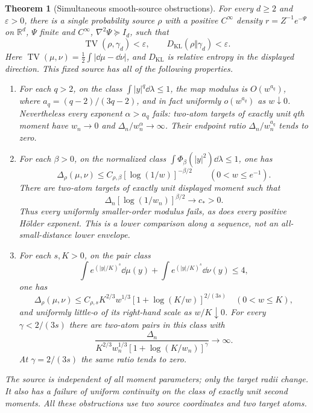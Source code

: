 \documentclass[11pt]{article}
\numberwithin{equation}{section}
\newtheorem{theorem}{Theorem}[section]
\theoremstyle{remark}\newtheorem{remark}[theorem]{Remark}
\newcommand{\R}{\mathbb R}\newcommand{\E}{\mathbb E}
\begin{document}
\begin{theorem}[Simultaneous smooth-source obstructions]\label{thm:bad-source}
For every $d\ge2$ and $\varepsilon>0$, there is a single probability source $\rho$ with a positive $C^\infty$ density $r=Z^{-1}e^{-\Psi}$ on $\R^d$, $\Psi$ finite and $C^\infty$, $\nabla^2\Psi\succeq I_d$, such that
\begin{equation}\label{eq:near-gaussian}
 \operatorname{TV}(\rho,\gamma_d)<\varepsilon,
 \qquad D_{\mathrm{KL}}(\rho\Vert\gamma_d)<\varepsilon.
\end{equation}
Here $\operatorname{TV}(\mu,\nu)=\tfrac12\int|\dd\mu-\dd\nu|$, and $D_{\mathrm{KL}}$ is relative entropy in the displayed direction. This fixed source has all of the following properties.
\begin{enumerate}
\item For each $q>2$, on the class $\int|y|^q\dd\lambda\le1$, the map modulus is $O(w^{a_q})$, where $a_q=(q-2)/(3q-2)$, and in fact uniformly $o(w^{a_q})$ as $w\downarrow0$. Nevertheless every exponent $\alpha>a_q$ fails: two-atom targets of exactly unit $q$th moment have $w_n\to0$ and $\Delta_n/w_n^\alpha\to\infty$. Their endpoint ratio $\Delta_n/w_n^{a_q}$ tends to zero.
\item For each $\beta>0$, on the normalized class $\int\Phi_\beta(|y|^2)\dd\lambda\le1$, one has
\begin{equation}\label{eq:bad-log-upper}
 \Delta_\rho(\mu,\nu)\le C_{\rho,\beta}[\log(1/w)]^{-\beta/2}
 \qquad(0<w\le e^{-1}).
\end{equation}
There are two-atom targets of exactly unit displayed moment such that
\begin{equation}\label{eq:bad-log-limit}
 \Delta_n[\log(1/w_n)]^{\beta/2}\longrightarrow c_*>0.
\end{equation}
Thus every uniformly smaller-order modulus fails, as does every positive H\"older exponent. This is a lower comparison along a sequence, not an all-small-distance lower envelope.
\item For each $s,K>0$, on the pair class
\begin{equation}\label{eq:bad-exp-class}
 \int e^{(|y|/K)^s}\dd\mu(y)+\int e^{(|y|/K)^s}\dd\nu(y)\le4,
\end{equation}
one has
\begin{equation}\label{eq:bad-exp-upper}
 \Delta_\rho(\mu,\nu)\le C_{\rho,s}K^{2/3}w^{1/3}
                    [1+\log(K/w)]^{2/(3s)}\quad(0<w\le K),
\end{equation}
and uniformly little-$o$ of its right-hand scale as $w/K\downarrow0$. For every $\gamma<2/(3s)$ there are two-atom pairs in this class with
\begin{equation}\label{eq:bad-exp-diverge}
 \frac{\Delta_n}{K^{2/3}w_n^{1/3}[1+\log(K/w_n)]^\gamma}
 \longrightarrow\infty.
\end{equation}
At $\gamma=2/(3s)$ the same ratio tends to zero.
\end{enumerate}
The source is independent of all moment parameters; only the target radii change. It also has a failure of uniform continuity on the class of exactly unit second moments. All these obstructions use two source coordinates and two target atoms.
\end{theorem}
\end{document}
